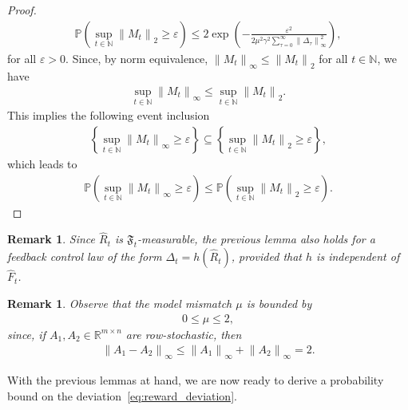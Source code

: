 \documentclass[10pt,leqno]{amsart}
\newcommand{\norm}[1]{\left \|#1 \right \|}
\newcommand{\R}{\mathbb{R}}
\newcommand{\N}{\mathbb{N}}
\newcommand{\Cost}{R}
\newcommand{\Fapx}{\hat{F}}
\newcommand{\disc}{\gamma}
\newcommand{\twonorm}[1]{\norm{#1}_2}
\newcommand{\infnorm}[1]{\norm{#1}_\infty}
\newcommand{\prob}{\mathbb{P}}
\newcommand{\Costpert}{\hat{\Cost}}
\newtheorem{remark}[theorem]{Remark}
\begin{document}
\begin{proof}
    \begin{align*}
        \prob\left(\sup_{t\in\N}\twonorm{M_t} \geq \varepsilon\right) \leq 2 \exp\left(-\frac{\varepsilon^2}{2\mu^2\disc^2\sum_{\tau = 0}^\infty \infnorm{\Delta_\tau}^2}\right),
    \end{align*}
    for all $\varepsilon > 0$. Since, by norm equivalence, $\infnorm{M_t} \leq \twonorm{M_t}$ for all $t \in \N$, we have
    \begin{align*}
        \sup_{t \in \N} \infnorm{M_t} \leq \sup_{t \in \N} \twonorm{M_t}.
    \end{align*}
    This implies the following event inclusion
    \begin{align*}
        \left\{\sup_{t \in \N} \infnorm{M_t} \geq \varepsilon\right\} \subseteq \left\{\sup_{t \in \N} \twonorm{M_t} \geq \varepsilon\right\},
    \end{align*}
    which leads to
    \begin{align*}
        \prob\left(\sup_{t \in \N} \infnorm{M_t} \geq \varepsilon\right) \leq \prob\left(\sup_{t \in \N} \twonorm{M_t} \geq \varepsilon\right).
    \end{align*}
\end{proof}
\begin{remark}
    Since $\Costpert_t$ is $\mathfrak{F}_t$-measurable, the previous lemma also holds for a feedback control law of the form $\Delta_t = h(\Costpert_t)$, provided that $h$ is independent of $\Fapx_t$.
\end{remark}
\begin{remark}
    Observe that the model mismatch $\mu$ is bounded by
    \begin{align*}
        0 \leq \mu \leq 2,
    \end{align*}
    since, if $A_1, A_2 \in \R^{m\times n}$ are row-stochastic, then
    \begin{align*}
        \infnorm{A_1 - A_2} \leq \infnorm{A_1} + \infnorm{A_2} = 2.
    \end{align*}
\end{remark}
\noindent With the previous lemmas at hand, we are now ready to derive a probability bound on the deviation~\eqref{eq:reward_deviation}.
\end{document}
